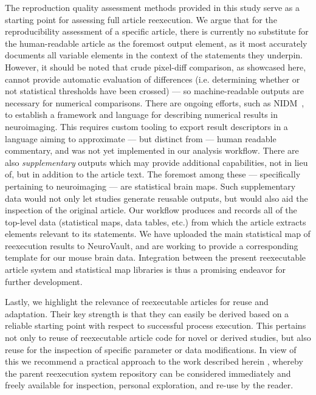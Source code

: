 The reproduction quality assessment methods provided in this study serve as a starting point for assessing full article reexecution.
We argue that for the reproducibility assessment of a specific article, there is currently no substitute for the human-readable article as the foremost output element, as it most accurately documents all variable elements in the context of the statements they underpin.
However, it should be noted that crude pixel-diff comparison, as showcased here, cannot provide automatic evaluation of differences (i.e. determining whether or not statistical thresholds have been crossed) — so machine-readable outputs are necessary for numerical comparisons.
There are ongoing efforts, such as NIDM~\cite{NIDM}, to establish a framework and language for describing numerical results in neuroimaging.
This requires custom tooling to export result descriptors in a language aiming to approximate — but distinct from — human readable commentary, and was not yet implemented in our analysis workflow.
There are also \emph{supplementary} outputs which may provide additional capabilities, not in lieu of, but in addition to the article text.
The foremost among these — specifically pertaining to neuroimaging — are statistical brain maps.
Such supplementary data would not only let studies generate reusable outputs, but would also aid the inspection of the original article.
Our workflow produces and records all of the top-level data (statistical maps, data tables, etc.) from which the article extracts elements relevant to its statements.
We have uploaded the main statistical map of reexecution results to NeuroVault, and are working to provide a corresponding template for our mouse brain data.
Integration between the present reexecutable article system and statistical map libraries is thus a promising endeavor for further development.

Lastly, we highlight the relevance of reexecutable articles for reuse and adaptation.
Their key strength is that they can easily be derived based on a reliable starting point with respect to successful process execution.
This pertains not only to reuse of reexecutable article code for novel or derived studies, but also reuse for the inspection of specific parameter or data modifications.
In view of this we recommend a practical approach to the work described herein \cite{me}, whereby the parent reexecution system repository can be considered immediately and freely available for inspection, personal exploration, and re-use by the reader.

